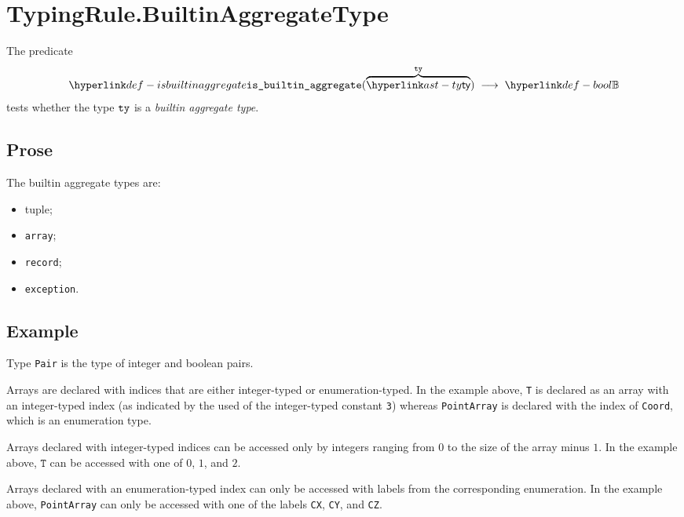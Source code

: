 
\section{TypingRule.BuiltinAggregateType \label{sec:TypingRule.BuiltinAggregateType}}
\hypertarget{def-isbuiltinaggregate}{}
The predicate
\[
  \isbuiltinaggregate(\overname{\ty}{\tty}) \;\aslto\; \Bool
\]
tests whether the type $\texttt{ty}$ is a \emph{builtin aggregate type}.

\subsection{Prose}
The builtin aggregate types are:
\begin{itemize}
\item tuple;
\item \texttt{array};
\item \texttt{record};
\item \texttt{exception}.
\end{itemize}

\subsection{Example}
Type \texttt{Pair} is the type of integer and boolean pairs.

Arrays are declared with indices that are either integer-typed
or enumeration-typed.  In the example above, \texttt{T} is
declared as an array with an integer-typed index (as indicated
by the used of the integer-typed constant \texttt{3}) whereas
\texttt{PointArray} is declared with the index of
\texttt{Coord}, which is an enumeration type.

Arrays declared with integer-typed indices can be accessed only by integers ranging from $0$ to
the size of the array minus $1$. In the example above, $\texttt{T}$ can be accessed with
one of $0$, $1$, and $2$.

Arrays declared with an enumeration-typed index can only be accessed with labels from the corresponding
enumeration. In the example above, \texttt{PointArray} can only be accessed with one of the labels
\texttt{CX}, \texttt{CY}, and \texttt{CZ}.

